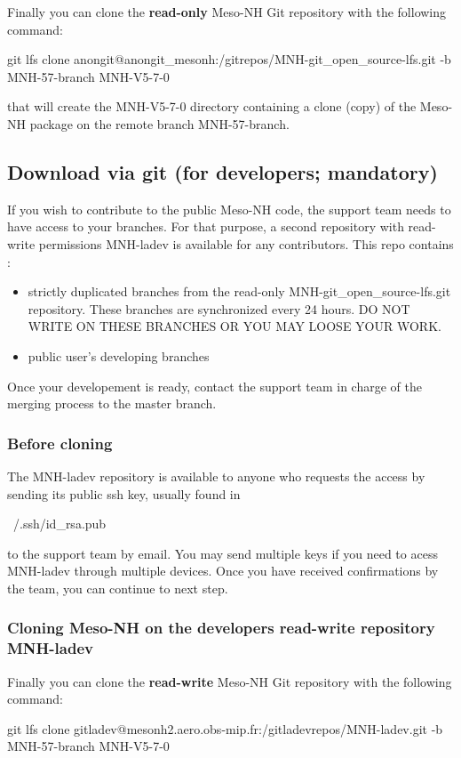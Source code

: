 Finally you can clone the \textbf{read-only} Meso-NH Git repository with the following command:
\begin{bashcode}
git lfs clone anongit@anongit_mesonh:/gitrepos/MNH-git_open_source-lfs.git -b MNH-57-branch MNH-V5-7-0
\end{bashcode}

that will create the MNH-V5-7-0 directory containing a clone (copy) of the Meso-NH package on the remote branch MNH-57-branch.

\subsection{Download via git (for developers; mandatory)}
\label{sec:dev_sec}
If you wish to contribute to the public Meso-NH code, the support team needs to have access to your branches. For that purpose, a second repository with read-write permissions MNH-ladev is available for any contributors. This repo contains :
\begin{itemize}
    \item strictly duplicated branches from the read-only MNH-git\_open\_source-lfs.git repository. These branches are synchronized every 24 hours. DO NOT WRITE ON THESE BRANCHES OR YOU MAY LOOSE YOUR WORK.
    \item public user's developing branches
\end{itemize}

Once your developement is ready, contact the support team in charge of the merging process to the master branch.
\subsubsection{Before cloning}
The MNH-ladev repository is available to anyone who requests the access by sending its public ssh key, usually found in 
\begin{bashcode}
    ~/.ssh/id_rsa.pub
\end{bashcode}
to the support team by email. You may send multiple keys if you need to acess MNH-ladev through multiple devices.
Once you have received confirmations by the team, you can continue to next step.

\subsubsection{Cloning Meso-NH on the developers read-write repository MNH-ladev}
Finally you can clone the \textbf{read-write} Meso-NH Git repository with the following command:
\begin{bashcode}
git lfs clone gitladev@mesonh2.aero.obs-mip.fr:/gitladevrepos/MNH-ladev.git -b MNH-57-branch MNH-V5-7-0
\end{bashcode}

